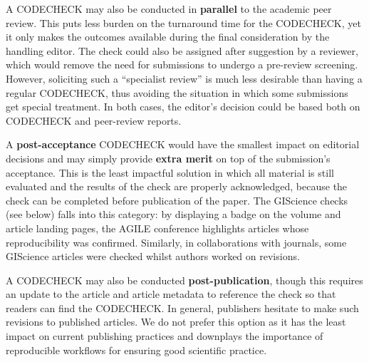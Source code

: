 \documentclass[12pt]{article}
\begin{document}
A CODECHECK may also be conducted in \textbf{parallel} to the academic
peer review.  This puts less burden on the turnaround time for the
CODECHECK, yet it only makes the outcomes available during the final
consideration by the handling editor.  The check could also be
assigned after suggestion by a reviewer, which would remove the need
for submissions to undergo a pre-review screening.  However,
soliciting such a ``specialist review'' is much less desirable than
having a regular CODECHECK, thus avoiding the situation in which some
submissions get special treatment. In both cases, the editor's
decision could be based both on CODECHECK and peer-review reports.

A \textbf{post-acceptance} CODECHECK would have the smallest impact on
editorial decisions and may simply provide \textbf{extra merit} on top
of the submission's acceptance.  This is the least impactful solution
in which all material is still evaluated and the results of the check
are properly acknowledged, because the check can be completed before
publication of the paper.  The GIScience checks (see
below) falls into this category: by displaying a badge on the volume
and article landing pages, the AGILE conference highlights articles
whose reproducibility was confirmed.  Similarly, in
collaborations with journals, some GIScience articles were
checked whilst authors worked on revisions.

A CODECHECK may also be conducted \textbf{post-publication}, though
this requires an update to the article and article metadata to
reference the check so that readers can find the CODECHECK.  In
general, publishers hesitate to make such revisions to published
articles.  We do not prefer this option as it has the least impact on
current publishing practices and downplays the importance
of reproducible workflows for ensuring good scientific practice.
\end{document}
